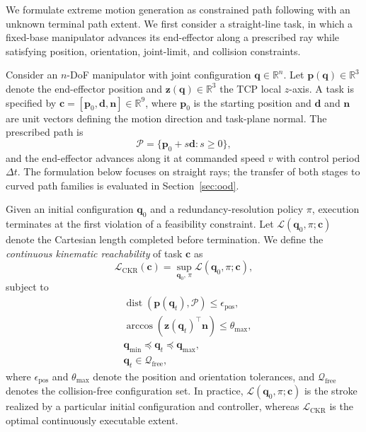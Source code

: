 \documentclass[journal, twoside]{IEEEtran}
\begin{document}
We formulate extreme motion generation as constrained path following with an unknown terminal path extent. We first consider a straight-line task, in which a fixed-base manipulator advances its end-effector along a prescribed ray while satisfying position, orientation, joint-limit, and collision constraints.

Consider an $n$-DoF manipulator with joint configuration $\mathbf{q}\in\mathbb{R}^{n}$. Let $\mathbf{p}(\mathbf{q})\in\mathbb{R}^{3}$ denote the end-effector position and $\mathbf{z}(\mathbf{q})\in\mathbb{R}^{3}$ the TCP local $z$-axis. A task is specified by $\mathbf{c}=[\mathbf{p}_{0},\mathbf{d},\mathbf{n}]\in\mathbb{R}^{9}$, where $\mathbf{p}_{0}$ is the starting position and $\mathbf{d}$ and $\mathbf{n}$ are unit vectors defining the motion direction and task-plane normal. The prescribed path is
\begin{equation}
\mathcal{P}=\{\mathbf{p}_{0}+s\mathbf{d}:s\geq 0\},
\end{equation}
and the end-effector advances along it at commanded speed $v$ with control period $\Delta t$. The formulation below focuses on straight rays; the transfer of both stages to curved path families is evaluated in Section~\ref{sec:ood}.

Given an initial configuration $\mathbf{q}_{0}$ and a redundancy-resolution policy $\pi$, execution terminates at the first violation of a feasibility constraint. Let $\mathcal{L}(\mathbf{q}_{0},\pi;\mathbf{c})$ denote the Cartesian length completed before termination. We define the \emph{continuous kinematic reachability} of task $\mathbf{c}$ as
\begin{equation}
\label{eq:ckr}
\mathcal{L}_{\mathrm{CKR}}(\mathbf{c})
=
\sup_{\mathbf{q}_{0},\,\pi}
\mathcal{L}(\mathbf{q}_{0},\pi;\mathbf{c}),
\end{equation}
subject to
\begin{align}
&\operatorname{dist}\!\left(
\mathbf{p}(\mathbf{q}_{t}),\mathcal{P}
\right)
\leq \epsilon_{\mathrm{pos}},
\label{eq:pos_constraint}\\
&\arccos\!\left(
\mathbf{z}(\mathbf{q}_{t})^{\top}\mathbf{n}
\right)
\leq \theta_{\max},
\label{eq:ori_constraint}\\
&\mathbf{q}_{\min}
\preceq \mathbf{q}_{t}
\preceq \mathbf{q}_{\max},
\label{eq:jl_constraint}\\
&\mathbf{q}_{t}\in\mathcal{Q}_{\mathrm{free}},
\label{eq:collision_constraint}
\end{align}
where $\epsilon_{\mathrm{pos}}$ and $\theta_{\max}$ denote the position and orientation tolerances, and $\mathcal{Q}_{\mathrm{free}}$ denotes the collision-free configuration set. In practice, $\mathcal{L}(\mathbf{q}_{0},\pi;\mathbf{c})$ is the stroke realized by a particular initial configuration and controller, whereas $\mathcal{L}_{\mathrm{CKR}}$ is the optimal continuously executable extent.
\end{document}
